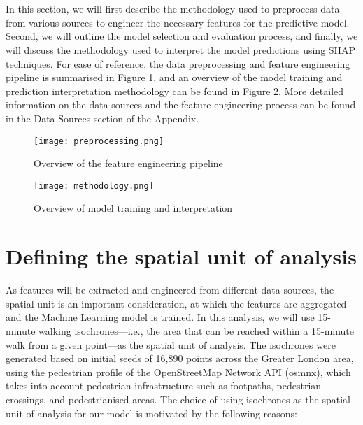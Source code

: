 
\section*{}

In this section, we will first describe the methodology used to preprocess data from various sources to engineer the necessary features for the predictive model. Second, we will outline the model selection and evaluation process, and finally, we will discuss the methodology used to interpret the model predictions using SHAP techniques. For ease of reference, the data preprocessing and feature engineering pipeline is summarised in Figure \ref{fig:preprocessing}, and an overview of the model training and prediction interpretation methodology can be found in Figure \ref{fig:methodology}. More detailed information on the data sources and the feature engineering process can be found in the Data Sources section of the Appendix.

\begin{figure}[!ht]
    \centering
    \texttt{[image: preprocessing.png]}
    \caption{Overview of the feature engineering pipeline}
    \label{fig:preprocessing}
\end{figure}

\begin{figure}[!ht]
    \centering
    \texttt{[image: methodology.png]}
    \caption{Overview of model training and interpretation}
    \label{fig:methodology}
\end{figure}

\pagebreak %
\section{Defining the spatial unit of analysis}

As features will be extracted and engineered from different data sources, the spatial unit is an important consideration, at which the features are aggregated and the Machine Learning model is trained. In this analysis, we will use 15-minute walking isochrones---i.e., the area that can be reached within a 15-minute walk from a given point---as the spatial unit of analysis. The isochrones were generated based on initial seeds of 16,890 points across the Greater London area, using the pedestrian profile of the OpenStreetMap Network API (osmnx), which takes into account pedestrian infrastructure such as footpaths, pedestrian crossings, and pedestrianised areas. The choice of using isochrones as the spatial unit of analysis for our model is motivated by the following reasons: 

